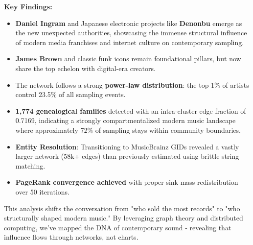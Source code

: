 \documentclass[a4paper, 12pt]{article}
\begin{document}
\textbf{Key Findings:}
\begin{itemize}
    \item \textbf{Daniel Ingram} and Japanese electronic projects like \textbf{Denonbu} emerge as the new unexpected authorities, showcasing the immense structural influence of modern media franchises and internet culture on contemporary sampling.
    \item \textbf{James Brown} and classic funk icons remain foundational pillars, but now share the top echelon with digital-era creators.
    \item The network follows a strong \textbf{power-law distribution}: the top 1\% of artists control 23.5\% of all sampling events.
    \item \textbf{1,774 genealogical families} detected with an intra-cluster edge fraction of 0.7169, indicating a strongly compartmentalized modern music landscape where approximately 72\% of sampling stays within community boundaries.
    \item \textbf{Entity Resolution}: Transitioning to MusicBrainz GIDs revealed a vastly larger network (58k+ edges) than previously estimated using brittle string matching.
    \item \textbf{PageRank convergence achieved} with proper sink-mass redistribution over 50 iterations.
\end{itemize}

\noindent This analysis shifts the conversation from "who sold the most records" to "who structurally shaped modern music." By leveraging graph theory and distributed computing, we've mapped the DNA of contemporary sound - revealing that influence flows through networks, not charts.


\printbibliography[title={References}]
\end{document}
